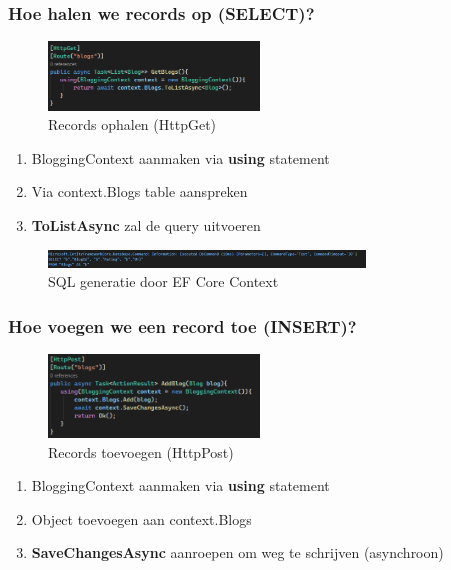 \documentclass{article}
\begin{document}
\subsubsection{Hoe halen we records op (SELECT)?}

\begin{figure}[H]
    \centering
    \includegraphics[width=0.5\textwidth]{efcore-select.png}
    \caption{Records ophalen (HttpGet)}
\end{figure}

\begin{enumerate}
    \item BloggingContext aanmaken via \textbf{using} statement
    \item Via context.Blogs table aanspreken
    \item \textbf{ToListAsync} zal de query uitvoeren
\end{enumerate}



\begin{figure}[H]
    \centering
    \includegraphics[width=0.75\textwidth]{efcore-select2.png}
    \caption{SQL generatie door EF Core Context}
\end{figure}



\subsubsection{Hoe voegen we een record toe (INSERT)?}

\begin{figure}[H]
    \centering
    \includegraphics[width=0.5\textwidth]{efcore-insert.png}
    \caption{Records toevoegen (HttpPost)}
\end{figure}

\begin{enumerate}
    \item BloggingContext aanmaken via \textbf{using} statement
    \item Object toevoegen aan context.Blogs
    \item \textbf{SaveChangesAsync} aanroepen om weg te schrijven (asynchroon)
\end{enumerate}
\end{document}
